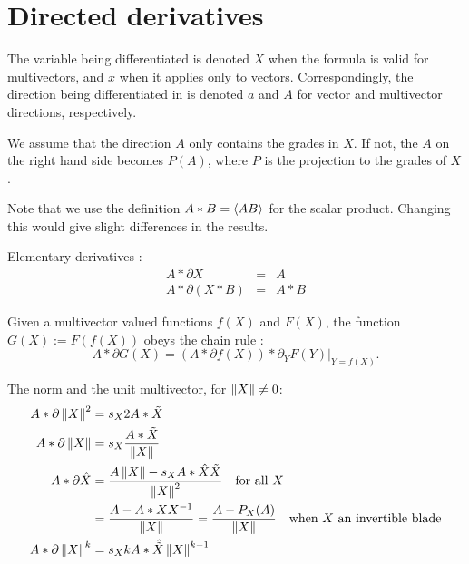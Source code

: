 \documentclass[a4paper,12pt]{article}
\begin{document}
\section{Directed derivatives}

The variable being differentiated is denoted $X$ when the formula is valid for multivectors, and $x$ when it applies only to vectors. Correspondingly, the direction being differentiated in is denoted $a$ and $A$ for vector and multivector directions, respectively.

We assume that the direction $A$ only contains the grades in $X$. If not, the $A$ on the right hand side becomes $P(A)$, where $P$ is the projection to the grades of $X$.

Note that we use the definition $A * B = \langle A B\rangle_{}$ for the scalar product. Changing this would give slight differences in the results.

Elementary derivatives \cite{HitzerCalculus}:
\begin{eqnarray}
\label{eq:iddiff}
A * \partial  X &=& A\\
\label{eq:scalpdiff}
A * \partial (X * B)  &=&  A * B
\end{eqnarray}

Given a multivector valued functions $f(X)$ and $F(X)$, the function $G(X) := F(f(X))$ obeys the chain rule \cite{HitzerCalculus}:
\begin{equation}
\label{eq:chainrule}
A * \partial G(X) = (A * \partial f(X))*\partial_Y F(Y)\vert_{Y = f(X)}.
\end{equation}

The norm and the unit multivector, for $\left\lVert X\right\rVert \neq 0$:
\begin{align}
\label{eq:normsqrdif}
A * \partial \left\lVert X\right\rVert^2 &= s_{X}2 A * \tilde{X}\\
\label{eq:normdif}
A * \partial \left\lVert X\right\rVert &= s_{X} \frac{A * \tilde{X}}{\left\lVert X\right\rVert}\\
\label{eq:normeddif}
A * \partial \hat{X} &= \frac{A \left\lVert X\right\rVert - s_{X} A * \hat{X} \tilde{X}}{\left\lVert X\right\rVert^2}\quad \textrm {for all $X$}\nonumber\\
&= \frac{A - A * X X^{-1}}{\left\lVert X\right\rVert} = \frac{A- P_{X}(A)}{\left\lVert X\right\rVert}\quad \textrm{when $X$ an invertible blade}\\
\label{eq:normtokdif}
A * \partial \left\lVert X\right\rVert^k &= s_{X} k A * \hat{\tilde{X}} \left\lVert X\right\rVert^{k-1}
\end{align}
\end{document}
